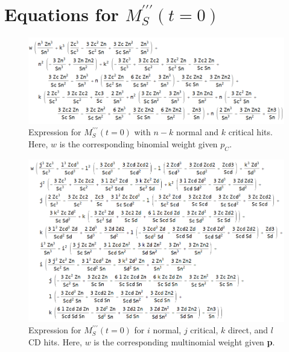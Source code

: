 \documentclass{article}
\begin{document}
    \section*{Equations for $M^{\prime\prime\prime}_S(t=0)$}
    \begin{figure}[H]
        \centering
        \includegraphics[width=0.85\linewidth]{img/third-deriv-CH.PNG}
        \caption{Expression for $M^{\prime\prime\prime}_S(t=0)$ with $n-k$ normal and $k$ critical hits. Here, $w$ is the corresponding binomial weight given $p_C$.}\label{fig:binom-3rd-deriv}
    \end{figure}

    \begin{figure}[H]
        \centering
        \includegraphics[width=0.9\linewidth]{img/third-deriv.PNG}
        \caption{Expression for $M^{\prime\prime\prime}_S(t=0)$ for $i$ normal, $j$ critical, $k$ direct, and $l$ CD hits. Here, $w$ is the corresponding multinomial weight given \textbf{p}.}\label{fig:multi-3rd-deriv}
    \end{figure}
\end{document}
